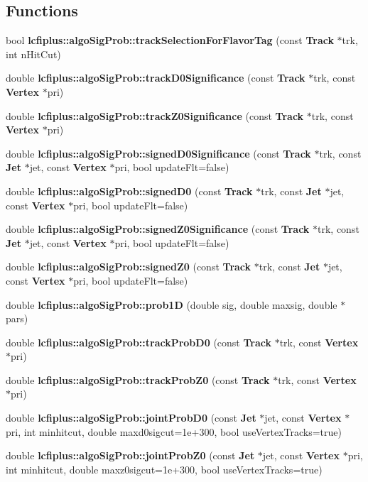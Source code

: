 \subsection*{Functions}
\begin{DoxyCompactItemize}
\item 
bool \textbf{ lcfiplus\+::algo\+Sig\+Prob\+::track\+Selection\+For\+Flavor\+Tag} (const \textbf{ Track} $\ast$trk, int n\+Hit\+Cut)
\item 
double \textbf{ lcfiplus\+::algo\+Sig\+Prob\+::track\+D0\+Significance} (const \textbf{ Track} $\ast$trk, const \textbf{ Vertex} $\ast$pri)
\item 
double \textbf{ lcfiplus\+::algo\+Sig\+Prob\+::track\+Z0\+Significance} (const \textbf{ Track} $\ast$trk, const \textbf{ Vertex} $\ast$pri)
\item 
double \textbf{ lcfiplus\+::algo\+Sig\+Prob\+::signed\+D0\+Significance} (const \textbf{ Track} $\ast$trk, const \textbf{ Jet} $\ast$jet, const \textbf{ Vertex} $\ast$pri, bool update\+Flt=false)
\item 
double \textbf{ lcfiplus\+::algo\+Sig\+Prob\+::signed\+D0} (const \textbf{ Track} $\ast$trk, const \textbf{ Jet} $\ast$jet, const \textbf{ Vertex} $\ast$pri, bool update\+Flt=false)
\item 
double \textbf{ lcfiplus\+::algo\+Sig\+Prob\+::signed\+Z0\+Significance} (const \textbf{ Track} $\ast$trk, const \textbf{ Jet} $\ast$jet, const \textbf{ Vertex} $\ast$pri, bool update\+Flt=false)
\item 
double \textbf{ lcfiplus\+::algo\+Sig\+Prob\+::signed\+Z0} (const \textbf{ Track} $\ast$trk, const \textbf{ Jet} $\ast$jet, const \textbf{ Vertex} $\ast$pri, bool update\+Flt=false)
\item 
double \textbf{ lcfiplus\+::algo\+Sig\+Prob\+::prob1D} (double sig, double maxsig, double $\ast$pars)
\item 
double \textbf{ lcfiplus\+::algo\+Sig\+Prob\+::track\+Prob\+D0} (const \textbf{ Track} $\ast$trk, const \textbf{ Vertex} $\ast$pri)
\item 
double \textbf{ lcfiplus\+::algo\+Sig\+Prob\+::track\+Prob\+Z0} (const \textbf{ Track} $\ast$trk, const \textbf{ Vertex} $\ast$pri)
\item 
double \textbf{ lcfiplus\+::algo\+Sig\+Prob\+::joint\+Prob\+D0} (const \textbf{ Jet} $\ast$jet, const \textbf{ Vertex} $\ast$pri, int minhitcut, double maxd0sigcut=1e+300, bool use\+Vertex\+Tracks=true)
\item 
double \textbf{ lcfiplus\+::algo\+Sig\+Prob\+::joint\+Prob\+Z0} (const \textbf{ Jet} $\ast$jet, const \textbf{ Vertex} $\ast$pri, int minhitcut, double maxz0sigcut=1e+300, bool use\+Vertex\+Tracks=true)

\end{DoxyCompactItemize}
